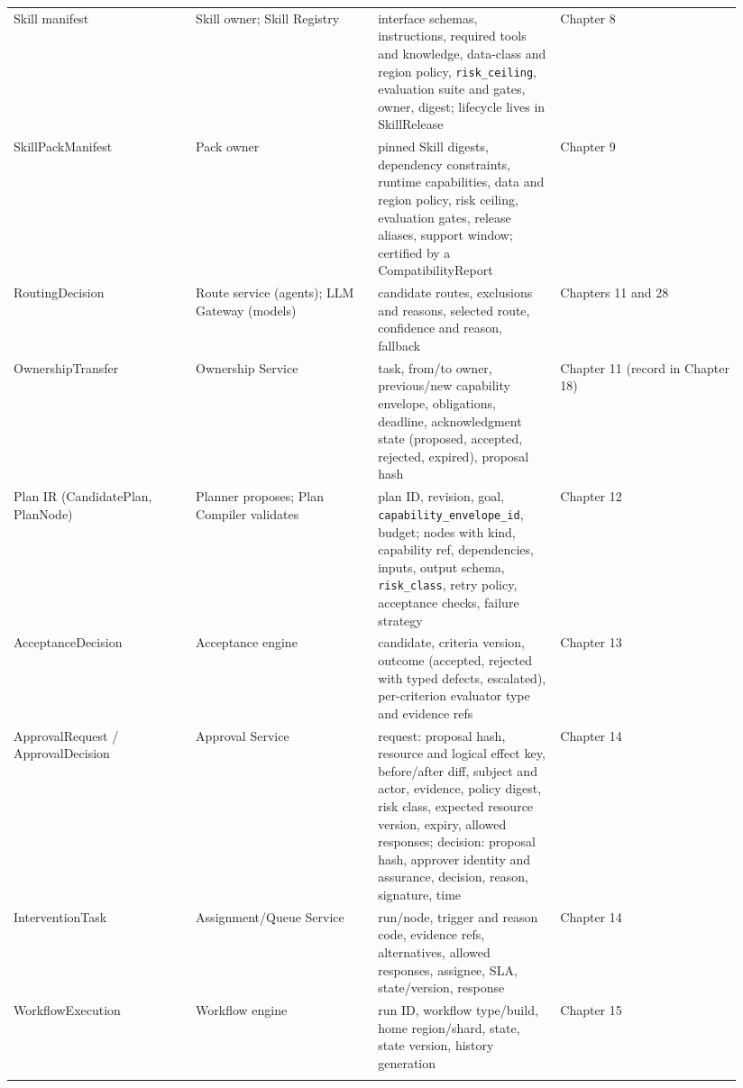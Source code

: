 \begin{longtable}{@{}Y{0.2350\linewidth}Y{0.2350\linewidth}Y{0.2350\linewidth}Y{0.2350\linewidth}@{}}
Skill manifest & Skill owner; Skill Registry & interface schemas, instructions, required tools and knowledge, data-class and region policy, \lstinline[style=bookinline]!risk_ceiling!, evaluation suite and gates, owner, digest; lifecycle lives in SkillRelease & Chapter 8 \\
SkillPackManifest & Pack owner & pinned Skill digests, dependency constraints, runtime capabilities, data and region policy, risk ceiling, evaluation gates, release aliases, support window; certified by a CompatibilityReport & Chapter 9 \\
RoutingDecision & Route service (agents); LLM Gateway (models) & candidate routes, exclusions and reasons, selected route, confidence and reason, fallback & Chapters 11 and 28 \\
OwnershipTransfer & Ownership Service & task, from/to owner, previous/new capability envelope, obligations, deadline, acknowledgment state (proposed, accepted, rejected, expired), proposal hash & Chapter 11 (record in Chapter 18) \\
Plan IR (CandidatePlan, PlanNode) & Planner proposes; Plan Compiler validates & plan ID, revision, goal, \lstinline[style=bookinline]!capability_envelope_id!, budget; nodes with kind, capability ref, dependencies, inputs, output schema, \lstinline[style=bookinline]!risk_class!, retry policy, acceptance checks, failure strategy & Chapter 12 \\
AcceptanceDecision & Acceptance engine & candidate, criteria version, outcome (accepted, rejected with typed defects, escalated), per-criterion evaluator type and evidence refs & Chapter 13 \\
ApprovalRequest / ApprovalDecision & Approval Service & request: proposal hash, resource and logical effect key, before/after diff, subject and actor, evidence, policy digest, risk class, expected resource version, expiry, allowed responses; decision: proposal hash, approver identity and assurance, decision, reason, signature, time & Chapter 14 \\
InterventionTask & Assignment/Queue Service & run/node, trigger and reason code, evidence refs, alternatives, allowed responses, assignee, SLA, state/version, response & Chapter 14 \\
WorkflowExecution & Workflow engine & run ID, workflow type/build, home region/shard, state, state version, history generation & Chapter 15 \\

\end{longtable}
